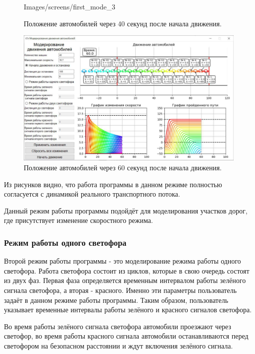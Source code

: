 \documentclass[12pt, a4paper]{extarticle}
\numberwithin{equation}{section}
\numberwithin{figure}{section}
\begin{document}
\begin{figure}[h!]
\begin{center}
\begin{minipage}[h]{0.48\linewidth}
			{Images/screens/first_mode_3}
			\caption{Положение автомобилей через 40 секунд после начала движения.}
			\label{first_mode_3}
		\end{minipage}
			\hfill 
		\begin{minipage}[h]{0.48\linewidth}
			\includegraphics[width=1\linewidth]
			{Images/screens/first_mode_4}
			\caption{Положение автомобилей через 60 секунд после начала движения.}
			\label{first_mode_4}
		\end{minipage}
	\end{center}
\end{figure}

Из рисунков видно, что работа программы в данном режиме полностью согласуется с динамикой реального транспортного потока.

Данный режим работы программы подойдёт для моделирования участков дорог, где присутствует изменение скоростного режима.

\subsubsection{Режим работы одного светофора}

Второй режим работы программы - это моделирование режима работы одного светофора. Работа светофора состоит из циклов, которые в свою очередь состоят из двух фаз. Первая фаза определяется временным интервалом работы зелёного сигнала светофора, а вторая - красного. Именно эти параметры пользователь задаёт в данном режиме работы программы. Таким образом, пользователь указывает временные интервалы работы зелёного и красного сигналов светофора. 

Во время работы зелёного сигнала светофора автомобили проезжают через светофор, во время работы красного сигнала автомобили останавливаются перед светофором на безопасном расстоянии и ждут включения зелёного сигнала. 
\end{document}
